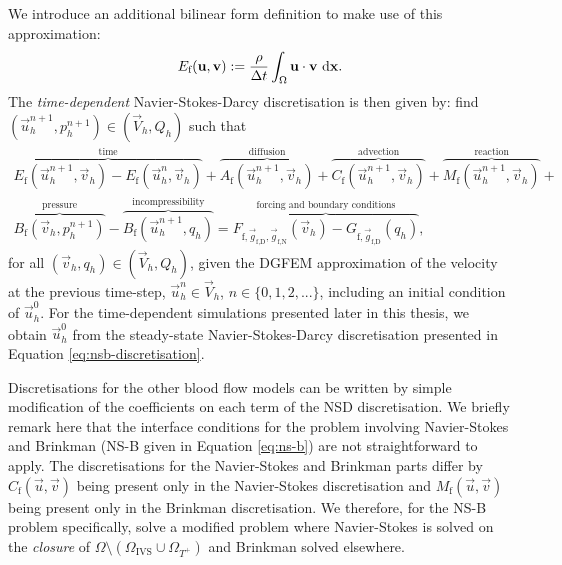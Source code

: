             We introduce an additional bilinear form definition to make use of this approximation:
            \begin{equation}
                E_\text{f}(\boldsymbol{\mathbf{u}}, \boldsymbol{\mathbf{v}}) := \frac{\rho}{\Delta t} \int_\Omega \boldsymbol{\mathbf{u}} \cdot \boldsymbol{\mathbf{v}} ~\mathrm{d} \boldsymbol{\mathbf{x}}.
                \label{eq:nsb-wf-time-euler}
            \end{equation}
            The \textit{time-dependent} Navier-Stokes-Darcy discretisation is then given by: find $(\vec{u}^{n+1}_h, p^{n+1}_h) \in (\vec{V}_h, Q_h)$ such that
            \begin{multline}
                \overbrace{E_\text{f}(\vec{u}^{n+1}_h, \vec{v}_h) - E_\text{f}(\vec{u}^n_h, \vec{v}_h)}^{\text{time}} + \overbrace{A_\text{f}(\vec{u}^{n+1}_h, \vec{v}_h)}^{\text{diffusion}} + \overbrace{C_\text{f}(\vec{u}^{n+1}_h, \vec{v}_h)}^{\text{advection}} + \overbrace{M_\text{f}(\vec{u}^{n+1}_h, \vec{v}_h)}^{\text{reaction}} + \\ \overbrace{B_\text{f}(\vec{v}_h, p^{n+1}_h)}^{\text{pressure}} - \overbrace{B_\text{f}(\vec{u}^{n+1}_h, q_h)}^{\text{incompressibility}} = \overbrace{F_{\text{f},\vec{g}_\text{f,D},\vec{g}_\text{f,N}}(\vec{v}_h) - G_{\text{f},\vec{g}_\text{f,D}}(q_h)}^{\text{forcing and boundary conditions}},
                \label{eq:nsb-discretisation-time}
            \end{multline}
            for all $(\vec{v}_h, q_h) \in (\vec{V}_h, Q_h)$, given the DGFEM approximation of the velocity at the previous time-step, $\vec{u}^n_h \in \vec{V}_h$, $n \in \{0, 1, 2, ...\}$, including an initial condition of $\vec{u}^0_h$. For the time-dependent simulations presented later in this thesis, we obtain $\vec{u}^0_h$ from the steady-state Navier-Stokes-Darcy discretisation presented in Equation \eqref{eq:nsb-discretisation}.

            Discretisations for the other blood flow models can be written by simple modification of the coefficients on each term of the NSD discretisation. We briefly remark here that the interface conditions for the problem involving Navier-Stokes and Brinkman (NS-B given in Equation \eqref{eq:ns-b}) are not straightforward to apply. The discretisations for the Navier-Stokes and Brinkman parts differ by $C_\text{f}(\vec{u}, \vec{v})$ being present only in the Navier-Stokes discretisation and $M_\text{f}(\vec{u}, \vec{v})$ being present only in the Brinkman discretisation. We therefore, for the NS-B problem specifically, solve a modified problem where Navier-Stokes is solved on the \textit{closure} of $\Omega \setminus (\Omega_\text{IVS} \cup \Omega_{T^+})$ and Brinkman solved elsewhere.

